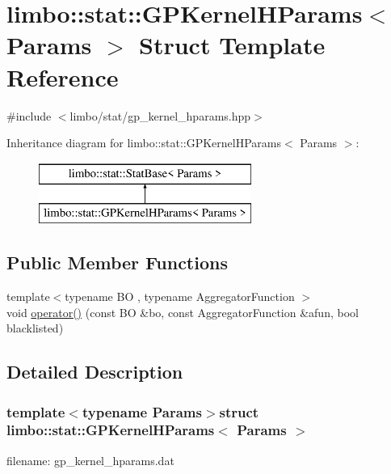\hypertarget{structlimbo_1_1stat_1_1_g_p_kernel_h_params}{}\section{limbo\+:\+:stat\+:\+:G\+P\+Kernel\+H\+Params$<$ Params $>$ Struct Template Reference}
\label{structlimbo_1_1stat_1_1_g_p_kernel_h_params}


{\ttfamily \#include $<$limbo/stat/gp\+\_\+kernel\+\_\+hparams.\+hpp$>$}

Inheritance diagram for limbo\+:\+:stat\+:\+:G\+P\+Kernel\+H\+Params$<$ Params $>$\+:\begin{figure}[H]
\begin{center}
\leavevmode
\includegraphics[height=2.000000cm]{structlimbo_1_1stat_1_1_g_p_kernel_h_params}
\end{center}
\end{figure}
\subsection*{Public Member Functions}
\begin{DoxyCompactItemize}
\item 
{\footnotesize template$<$typename B\+O , typename Aggregator\+Function $>$ }\\void \hyperlink{structlimbo_1_1stat_1_1_g_p_kernel_h_params_aea1e2090ba4344e6a7e1d94c467bc0c9}{operator()} (const B\+O \&bo, const Aggregator\+Function \&afun, bool blacklisted)
\end{DoxyCompactItemize}


\subsection{Detailed Description}
\subsubsection*{template$<$typename Params$>$struct limbo\+::stat\+::\+G\+P\+Kernel\+H\+Params$<$ Params $>$}

filename\+: {\ttfamily gp\+\_\+kernel\+\_\+hparams.\+dat} 


